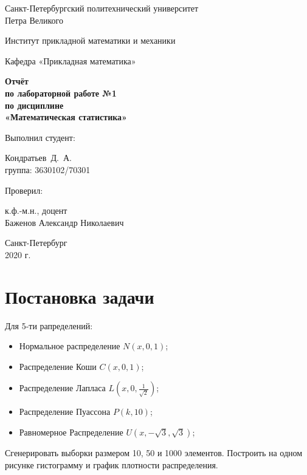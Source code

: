 \documentclass[12pt,a4paper]{article}
\begin{document}
	\begin{titlepage}
		\begin{center}			
			Санкт-Петербургский политехнический университет\\
			Петра Великого
			\vspace{0.25cm}
			
			Институт прикладной математики и механики
			
			Кафедра «Прикладная математика»
			\vfill
			
			\textbf{Отчёт\\
				по лабораторной работе №1\\
				по дисциплине\\
				«Математическая статистика»}\\[5mm]
			\bigskip
		\end{center}
		\vfill
		
		\hfill\begin{minipage}{0.45\textwidth}
			Выполнил студент:
			\vspace{0.2cm}
			
			Кондратьев~Д.~А.\\
			группа: 3630102/70301
		\end{minipage}%
		\bigskip
		
		\hfill\begin{minipage}{0.45\textwidth}
			Проверил:
			\vspace{0.2cm}
			
			к.ф.-м.н., доцент\\
			Баженов Александр Николаевич
		\end{minipage}%
		\vfill
		
		\begin{center}
			Санкт-Петербург\\
			2020 г.
		\end{center}
	\end{titlepage}
	
	
	
\tableofcontents{}
\newpage

\section{Постановка задачи}

	Для 5-ти рапределений:
	\begin{itemize}
		\item Нормальное распределение $N(x,0,1)$;
		\item Распределение Коши $C(x,0,1)$;
		\item Распределение Лапласа $L( x,0,\frac{1}{\sqrt{2}})$;
		\item Распределение Пуассона $P(k, 10)$;
		\item Равномерное Распределение $U(x,-\sqrt{3}, \sqrt{3})$;
	\end{itemize}
	Сгенерировать выборки размером 10, 50 и 1000 элементов.
	Построить на одном рисунке гистограмму и график плотности распределения.
\end{document}

